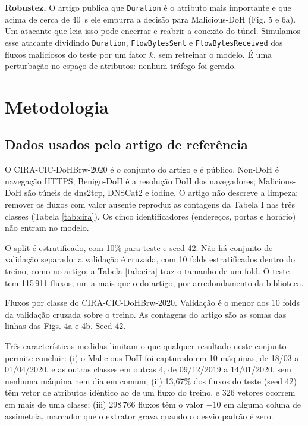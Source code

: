 \documentclass[conference]{IEEEtran}
\newcommand{\tabelacoluna}[1]{{\footnotesize\setlength{\tabcolsep}{3pt}%
  \begin{adjustbox}{max width=\columnwidth}\end{adjustbox}}}
\begin{document}
\textbf{Robustez.} O artigo publica que \texttt{Duration} é o atributo mais importante e que acima de cerca de 40~s ele empurra a decisão para Malicious-DoH (Fig. 5 e 6a). Um atacante que leia isso pode encerrar e reabrir a conexão do túnel. Simulamos esse atacante dividindo \texttt{Duration}, \texttt{FlowBytesSent} e \texttt{FlowBytesReceived} dos fluxos maliciosos do teste por um fator $k$, sem retreinar o modelo. É uma perturbação no espaço de atributos: nenhum tráfego foi gerado.

\section{Metodologia}

\subsection{Dados usados pelo artigo de referência}

O CIRA-CIC-DoHBrw-2020 \cite{montazeri2020} é o conjunto do artigo e é público. Non-DoH é navegação HTTPS; Benign-DoH é a resolução DoH dos navegadores; Malicious-DoH são túneis de dns2tcp, DNSCat2 e iodine. O artigo não descreve a limpeza: remover os fluxos com valor ausente reproduz as contagens da Tabela I nas três classes (Tabela \ref{tab:cira}). Os cinco identificadores (endereços, portas e horário) não entram no modelo.

O split é estratificado, com 10\% para teste e seed 42. Não há conjunto de validação separado: a validação é cruzada, com 10 folds estratificados dentro do treino, como no artigo; a Tabela \ref{tab:cira} traz o tamanho de um fold. O teste tem 115\,911 fluxos, um a mais que o do artigo, por arredondamento da biblioteca.

\begin{table}[!t]
\centering
\caption{Fluxos por classe do CIRA-CIC-DoHBrw-2020. Validação é o menor dos 10 folds da validação cruzada sobre o treino. As contagens do artigo são as somas das linhas das Figs. 4a e 4b. Seed 42.}
\label{tab:cira}
\tabelacoluna{dados_cira_contagens}
\end{table}

Três características medidas limitam o que qualquer resultado neste conjunto permite concluir: (i) o Malicious-DoH foi capturado em 10 máquinas, de 18/03 a 01/04/2020, e as outras classes em outras 4, de 09/12/2019 a 14/01/2020, sem nenhuma máquina nem dia em comum; (ii) 13,67\% dos fluxos do teste (seed 42) têm vetor de atributos idêntico ao de um fluxo do treino, e 326 vetores ocorrem em mais de uma classe; (iii) 298\,766 fluxos têm o valor $-10$ em alguma coluna de assimetria, marcador que o extrator grava quando o desvio padrão é zero.
\end{document}
